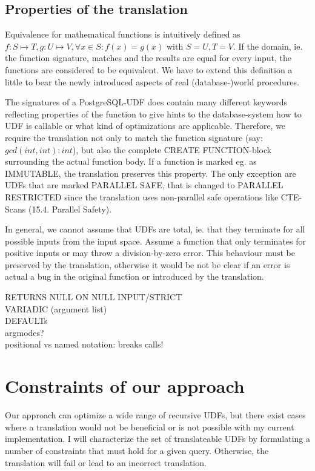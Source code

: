 
\subsection{Properties of the translation}
Equivalence for mathematical functions is intuitively defined as $f: S \mapsto T, g: U \mapsto V, \forall x \in S: f(x) = g(x)$ with $S = U, T = V$. If the domain, ie. the function signature, matches and the results are equal for every input, the functions are considered to be equivalent. We have to extend this definition a little to bear the newly introduced aspects of real (database-)world procedures.

The signatures of a PostgreSQL-UDF does contain many different keywords reflecting properties of the function to give hints to the database-system how to UDF is callable or what kind of optimizations are applicable. Therefore, we require the translation not only to match the function signature (say: $gcd(int, int) : int$), but also the complete CREATE FUNCTION-block surrounding the actual function body. If a function is marked eg. as IMMUTABLE, the translation preserves this property. The only exception are UDFs that are marked PARALLEL SAFE, that is changed to PARALLEL RESTRICTED since the translation uses non-parallel safe operations like CTE-Scans (15.4. Parallel Safety).

In general, we cannot assume that UDFs are total, ie. that they terminate for all possible inputs from the input space. Assume a function that only terminates for positive inputs or may throw a division-by-zero error. This behaviour must be preserved by the translation, otherwise it would be not be clear if an error is actual a bug in the original function or introduced by the translation.

RETURNS NULL ON NULL INPUT/STRICT\\
VARIADIC (argument list)\\
DEFAULTs\\
argmodes?\\
positional vs named notation: breaks calls!





\section{Constraints of our approach}
Our approach can optimize a wide range of recursive UDFs, but there exist cases where a translation would not be beneficial or is not possible with my current implementation. I will characterize the set of translateable UDFs by formulating a number of constraints that must hold for a given query. Otherwise, the translation will fail or lead to an incorrect translation.
 
